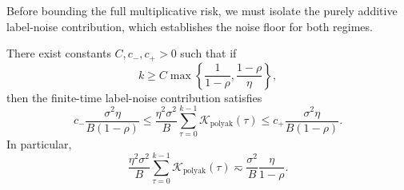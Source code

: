 \documentclass[11pt]{article}
\newcommand{\polyak}{\mathrm{polyak}}
\begin{document}

Before bounding the full multiplicative risk, we must isolate the purely additive label-noise contribution, which establishes the noise floor for both regimes.

\begin{lemma}
\label{lem:pol_label_noise}
There exist constants $C,c_-,c_+>0$ such that if
\begin{equation}
\label{eq:pol_label_noise_time_condition}
    k\ge
    C
    \max\left\{
        \frac{1}{1-\rho},
        \frac{1-\rho}{\eta}
    \right\},
\end{equation}
then the finite-time label-noise contribution satisfies
\begin{equation}
\label{eq:pol_label_noise_explicit_bounds}
    c_-\frac{\sigma^2\eta}{B(1-\rho)}
    \le
    \frac{\eta^2\sigma^2}{B}\sum_{\tau=0}^{k-1}\mathcal{K}_{\polyak}(\tau)
    \le
    c_+\frac{\sigma^2\eta}{B(1-\rho)}.
\end{equation}
In particular,
\[
    \frac{\eta^2\sigma^2}{B}\sum_{\tau=0}^{k-1}\mathcal{K}_{\polyak}(\tau)
    \eqsim
    \frac{\sigma^2}{B}\frac{\eta}{1-\rho}.
\]
\end{lemma}
\end{document}
